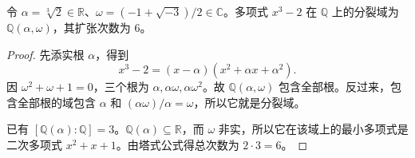 \documentclass[lang=cn,a4paper,fontset=none,zihao=false,10pt,openany,twoside]{beautybook}
\numberwithin{algorithm}{chapter}
\begin{document}
\begin{example}[一个根与全部根的区别]
令 $\alpha=\sqrt[3]2\in\mathbb R$、$\omega=(-1+\sqrt{-3})/2\in\mathbb C$。多项式 $x^3-2$ 在 $\mathbb Q$ 上的分裂域为 $\mathbb Q(\alpha,\omega)$，其扩张次数为 $6$。
\end{example}
\begin{proof}
先添实根 $\alpha$，得到
\[
 x^3-2=(x-\alpha)(x^2+\alpha x+\alpha^2).
\]
因 $\omega^2+\omega+1=0$，三个根为 $\alpha,\alpha\omega,\alpha\omega^2$。故 $\mathbb Q(\alpha,\omega)$ 包含全部根。反过来，包含全部根的域包含 $\alpha$ 和 $(\alpha\omega)/\alpha=\omega$，所以它就是分裂域。

已有 $[\mathbb Q(\alpha):\mathbb Q]=3$。$\mathbb Q(\alpha)\subseteq\mathbb R$，而 $\omega$ 非实，所以它在该域上的最小多项式是二次多项式 $x^2+x+1$。由塔式公式得总次数为 $2\cdot3=6$。
\end{proof}
\end{document}
